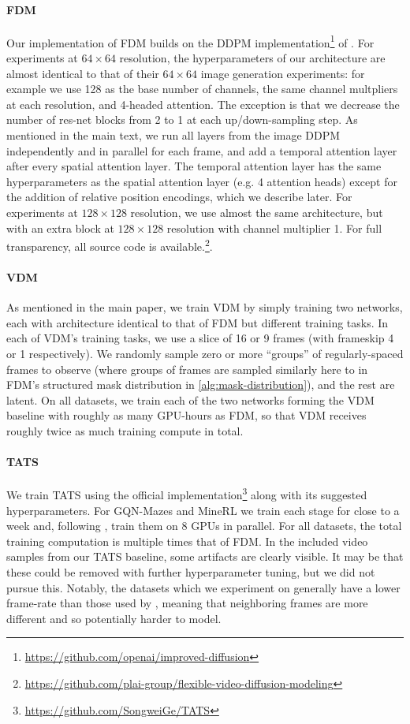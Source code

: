 \paragraph{FDM} 
Our implementation of FDM builds on the DDPM implementation\footnote{\url{https://github.com/openai/improved-diffusion}} of \citet{nichol2021improved}. For experiments at $64\times64$ resolution, the hyperparameters of our architecture are almost identical to that of their $64\times64$ image generation experiments: for example we use 128 as the base number of channels, the same channel multpliers at each resolution, and 4-headed attention. The exception is that we decrease the number of res-net blocks from 2 to 1 at each up/down-sampling step. As mentioned in the main text, we run all layers from the image DDPM independently and in parallel for each frame, and add a temporal attention layer after every spatial attention layer. The temporal attention layer has the same hyperparameters as the spatial attention layer (e.g. 4 attention heads) except for the addition of relative position encodings, which we describe later. For experiments at $128\times128$ resolution, we use almost the same architecture, but with an extra block at $128\times128$ resolution with channel multiplier 1.  For full transparency, all source code is available.\footnote{\url{https://github.com/plai-group/flexible-video-diffusion-modeling}}.

\paragraph{VDM}
As mentioned in the main paper, we train VDM by simply training two networks, each with architecture identical to that of FDM but different training tasks. In each of VDM's training tasks, we use a slice of 16 or 9 frames (with frameskip 4 or 1 respectively). We randomly sample zero or more ``groups'' of regularly-spaced frames to observe (where groups of frames are sampled similarly here to in FDM's structured mask distribution in \cref{alg:mask-distribution}), and the rest are latent. On all datasets, we train each of the two networks forming the VDM baseline with roughly as many GPU-hours as FDM, so that VDM receives roughly twice as much training compute in total.

\paragraph{TATS}
We train TATS using the official implementation\footnote{\url{https://github.com/SongweiGe/TATS}} along with its suggested hyperparameters. For GQN-Mazes and MineRL we train each stage for close to a week and, following \citet{ge2022long}, train them on 8 GPUs in parallel. For all datasets, the total training computation is multiple times that of FDM. In the included video samples from our TATS baseline, some artifacts are clearly visible. It may be that these could be removed with further hyperparameter tuning, but we did not pursue this. Notably, the datasets which we experiment on generally have a lower frame-rate than those used by \citet{ge2022long}, meaning that neighboring frames are more different and so potentially harder to model.

